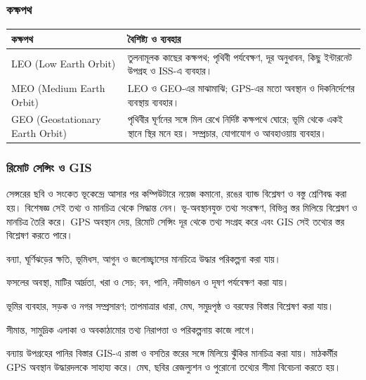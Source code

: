 \subsubsection{কক্ষপথ}
\begin{compacttable}
\begin{tabular}{|p{}|p{}|}
\hline\textbf{কক্ষপথ} & \textbf{বৈশিষ্ট্য ও ব্যবহার}\\\hline
LEO (Low Earth Orbit) & তুলনামূলক কাছের কক্ষপথ; পৃথিবী পর্যবেক্ষণ, দূর অনুধাবন, কিছু ইন্টারনেট উপগ্রহ ও ISS-এ ব্যবহার।\\\hline
MEO (Medium Earth Orbit) & LEO ও GEO-এর মাঝামাঝি; GPS-এর মতো অবস্থান ও দিকনির্দেশের ব্যবস্থায় ব্যবহার।\\\hline
GEO (Geostationary Earth Orbit) & পৃথিবীর ঘূর্ণনের সঙ্গে মিল রেখে নির্দিষ্ট কক্ষপথে ঘোরে; ভূমি থেকে একই স্থানে স্থির মনে হয়। সম্প্রচার, যোগাযোগ ও আবহাওয়ায় ব্যবহার।\\\hline
\end{tabular}
\end{compacttable}
\subsubsection{রিমোট সেন্সিং ও GIS}
সেন্সরের ছবি ও সংকেত ভূকেন্দ্রে আসার পর কম্পিউটারে নয়েজ কমানো, রঙের ব্যান্ড বিশ্লেষণ ও বস্তু শ্রেণিবদ্ধ করা হয়। বিশেষজ্ঞ সেই তথ্য ও মানচিত্র থেকে সিদ্ধান্ত নেন।
 ভূ-অবস্থানযুক্ত তথ্য সংরক্ষণ, বিভিন্ন স্তর মিলিয়ে বিশ্লেষণ ও মানচিত্র তৈরি করে। GPS অবস্থান দেয়, রিমোট সেন্সিং দূর থেকে তথ্য সংগ্রহ করে এবং GIS সেই তথ্যের স্তর বিশ্লেষণ করতে পারে।
\begin{compactpoints}
\item বন্যা, ঘূর্ণিঝড়ের ক্ষতি, ভূমিধস, আগুন ও জলোচ্ছ্বাসের মানচিত্রে উদ্ধার পরিকল্পনা করা যায়।
\item ফসলের অবস্থা, মাটির আর্দ্রতা, খরা ও সেচ; বন, পানি, নদীভাঙন ও দূষণ পর্যবেক্ষণ করা যায়।
\item ভূমির ব্যবহার, সড়ক ও নগর সম্প্রসারণ; তাপমাত্রার ধারা, মেঘ, সমুদ্রপৃষ্ঠ ও বরফের বিস্তার বিশ্লেষণ করা যায়।
\item সীমান্ত, সামুদ্রিক এলাকা ও অবকাঠামোর তথ্য নিরাপত্তা ও পরিকল্পনায় কাজে লাগে।
\end{compactpoints}
বন্যায় উপগ্রহের পানির বিস্তার GIS-এ রাস্তা ও বসতির স্তরের সঙ্গে মিলিয়ে ঝুঁকির মানচিত্র করা যায়। মাঠকর্মীর GPS অবস্থান উদ্ধারদলকে সাহায্য করে। মেঘ, ছবির রেজল্যুশন ও পুরোনো তথ্যের সীমা বিবেচনা করতে হয়।
